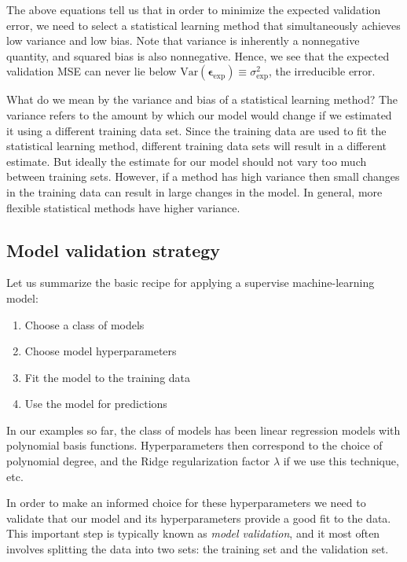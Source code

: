 \documentclass[%
oneside,                 %
final,                   %
10pt]{article}
\begin{document}
The above equations tell us that in
order to minimize the expected validation error, we need to select a
statistical learning method that simultaneously achieves low variance
and low bias. Note that variance is inherently a nonnegative quantity,
and squared bias is also nonnegative. Hence, we see that the expected
validation MSE can never lie below $\mathrm{Var}(\bm{\epsilon}_\mathrm{exp}) \equiv \sigma^2_\mathrm{exp}$, the irreducible error.


What do we mean by the variance and bias of a statistical learning
method? The variance refers to the amount by which our model would change if we
estimated it using a different training data set. Since the training
data are used to fit the statistical learning method, different
training data sets  will result in a different estimate. But ideally the
estimate for our model should not vary too much between training
sets. However, if a method has high variance  then small changes in
the training data can result in large changes in the model. In general, more
flexible statistical methods have higher variance.


\subsection{Model validation strategy}

Let us summarize the basic recipe for applying a supervise machine-learning model:

\begin{enumerate}
 \item Choose a class of models

 \item Choose model hyperparameters

 \item Fit the model to the training data

 \item Use the model for predictions
\end{enumerate}

\noindent
In our examples so far, the class of models has been linear regression models with polynomial basis functions. Hyperparameters then correspond to the choice of polynomial degree, and the Ridge regularization factor $\lambda$ if we use this technique, etc. 

In order to make an informed choice for these hyperparameters we need to validate that our model and its hyperparameters provide a good fit to the data. This important step is typically known as \emph{model validation}, and it most often involves splitting the data into two sets: the training set and the validation set. 
\end{document}
